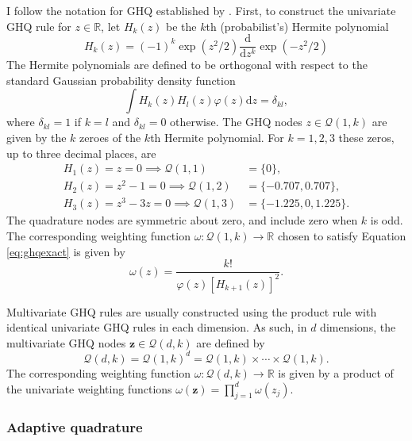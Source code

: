 \documentclass[a4paper, nobind]{templates/ociamthesis}
\begin{document}
I follow the notation for GHQ established by \textcite{bilodeau2022stochastic}.
First, to construct the univariate GHQ rule for \(z \in \mathbb{R}\), let \(H_k(z)\) be the \(k\)th (probabilist's) Hermite polynomial
\begin{equation}
H_k(z) = (-1)^k \exp(z^2 / 2) \frac{\text{d}}{\text{d}z^k} \exp(-z^2 / 2)
\end{equation}
The Hermite polynomials are defined to be orthogonal with respect to the standard Gaussian probability density function
\begin{equation}
\int H_k(z) H_l(z) \varphi(z) \text{d} z = \delta_{kl},
\end{equation}
where \(\delta_{kl} = 1\) if \(k = l\) and \(\delta_{kl} = 0\) otherwise.
The GHQ nodes \(z \in \mathcal{Q}(1, k)\) are given by the \(k\) zeroes of the \(k\)th Hermite polynomial.
For \(k = 1, 2, 3\) these zeros, up to three decimal places, are
\begin{align}
H_1(z) = z = 0 \implies \mathcal{Q}(1, 1) &= \{0\}, \\
H_2(z) = z^2 - 1 = 0 \implies \mathcal{Q}(1, 2) &= \{-0.707, 0.707\}, \\
H_3(z) = z^3 - 3z = 0 \implies \mathcal{Q}(1, 3) &= \{-1.225, 0, 1.225\}.
\end{align}
The quadrature nodes are symmetric about zero, and include zero when \(k\) is odd.
The corresponding weighting function \(\omega: \mathcal{Q}(1, k) \to \mathbb{R}\) chosen to satisfy Equation \eqref{eq:ghqexact} is given by
\begin{equation}
\omega(z) = \frac{k!}{\varphi(z) [H_{k + 1}(z)]^2}.
\end{equation}

Multivariate GHQ rules are usually constructed using the product rule with identical univariate GHQ rules in each dimension.
As such, in \(d\) dimensions, the multivariate GHQ nodes \(\mathbf{z} \in \mathcal{Q}(d, k)\) are defined by
\begin{equation}
\mathcal{Q}(d, k) = \mathcal{Q}(1, k)^d = \mathcal{Q}(1, k) \times \cdots \times \mathcal{Q}(1, k).
\end{equation}
The corresponding weighting function \(\omega: \mathcal{Q}(d, k) \to \mathbb{R}\) is given by a product of the univariate weighting functions \(\omega(\mathbf{z}) = \prod_{j = 1}^d \omega(z_j)\).

\hypertarget{adaptive-quadrature}{%
\subsubsection{Adaptive quadrature}\label{adaptive-quadrature}}
\end{document}
